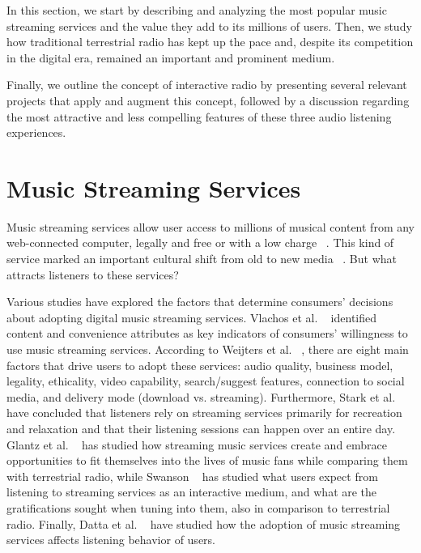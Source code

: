\cleardoublepage
\label{chap:relatedwork}

In this section, we start by describing and analyzing the most popular music streaming services and the value they add to its millions of users. Then, we study how traditional terrestrial radio has kept up the pace and, despite its competition in the digital era, remained an important and prominent medium.

Finally, we outline the concept of interactive radio by presenting several relevant projects that apply and augment this concept, followed by a discussion regarding the most attractive and less compelling features of these three audio listening experiences.

\section{Music Streaming Services}
\label{subchap:mss}
Music streaming services allow user access to millions of musical content from any web-connected computer, legally and free or with a low charge ~\cite{Swanson2013}. This kind of service marked an important cultural shift from old to new media ~\cite{Glantz2016}. But what attracts listeners to these services?

Various studies have explored the factors that determine consumers’ decisions about adopting digital music streaming services. Vlachos et al. ~\cite{Vlachos2003} identified content and convenience attributes as key indicators of consumers' willingness to use music streaming services. According to Weijters et al. ~\cite{Weijters2014}, there are eight main factors that drive users to adopt these services: audio quality, business model, legality, ethicality, video capability, search/suggest features, connection to social media, and delivery mode (download vs. streaming). Furthermore, Stark et al. ~\cite{Stark2013} have concluded that listeners rely on streaming services primarily for recreation and relaxation and that their listening sessions can happen over an entire day. Glantz et al. ~\cite{Glantz2016} has studied how streaming music services create and embrace opportunities to fit themselves into the lives of music fans while comparing them with terrestrial radio, while Swanson ~\cite{Swanson2013} has studied what users expect from listening to streaming services as an interactive medium, and what are the gratifications sought when tuning into them, also in comparison to terrestrial radio. Finally, Datta et al. ~\cite{Datta2018} have studied how the adoption of music streaming services affects listening behavior of users. 

